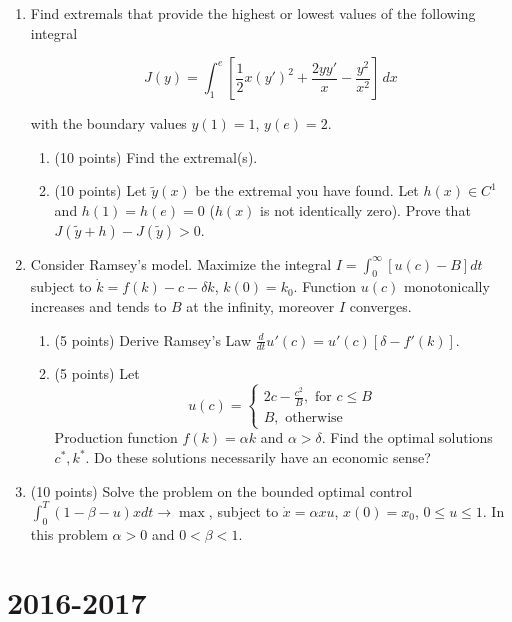 \documentclass[12pt, a4paper]{article}
\begin{document}
\begin{enumerate}[resume]

\item	Find extremals that provide the highest or lowest values of the following integral

\[
J(y)=\int _{1}^{e} \left[ \frac{1}{2} x(y')^{2} +\frac{2yy'}{x} -\frac{y^{2} }{x^{2} } \right] \, dx
\]

with the boundary values $y(1)=1$, $y(e)=2$.

\begin{enumerate}
\item (10 points) Find the extremal(s).

\item (10 points) Let $\tilde{y}(x)$ be the extremal you have found. Let  $h(x)\in C^{1} $ and $h(1)=h(e)=0$ ($h(x)$ is not identically zero). Prove that $J(\tilde{y}+h)-J(\tilde{y})>0$.
\end{enumerate}

\item Consider Ramsey's model. Maximize the integral $I=\int _{0}^{\infty }[u(c)-B]dt $ subject to $\dot{k}=f(k)-c-\delta k$, $k(0)=k_{0}$. Function $u(c)$ monotonically increases and tends to $B$ at the infinity, moreover $I$ converges.

\begin{enumerate}
\item (5 points) Derive Ramsey's Law $\frac{d}{dt} u'(c)=u'(c)[\delta -f'(k)]$.

\item (5 points) Let
\[
u(c) =
\begin{cases}
2c - \frac{c^2}{B}, \text{ for } c \leq B \\
B, \text{ otherwise }
\end{cases}
\]
Production function $f(k)=\alpha k$ and $\alpha >\delta $. Find the optimal solutions $c^*,k^*$. Do these solutions necessarily have an economic sense?
\end{enumerate}



\item (10 points) Solve the problem on the bounded optimal control $\int _{0}^{T}(1-\beta -u)xdt \to \max$, subject to $\dot{x}=\alpha xu$, $x(0)=x_{0}$, $0\le u\le 1$. In this problem $\alpha>0$ and $0<\beta <1$.

\end{enumerate}

\section{2016-2017}
\end{document}
